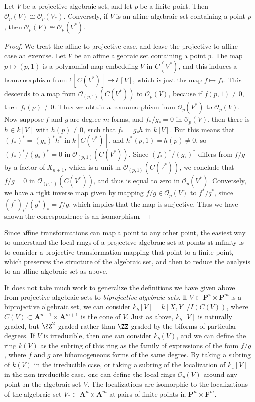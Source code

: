 \begin{theorem}
    Let $V$ be a projective algebraic set, and let $p$ be a finite point. Then $\mathcal{O}_p(V) \cong \mathcal{O}_p(V_*)$. Conversely, if $V$ is an affine algebraic set containing a point $p$, then $\mathcal{O}_p(V) \cong \mathcal{O}_p(V^*)$.
\end{theorem}
\begin{proof}
    We treat the affine to projective case, and leave the projective to affine case an exercise. Let $V$ be an affine algebraic set containing a point $p$. The map $p \mapsto (p,1)$ is a polynomial map embedding $V$ in $C(V^*)$, and this induces a homomorphism from $k[C(V^*)] \to k[V]$, which is just the map $f \mapsto f_*$. This descends to a map from $\mathcal{O}_{(p,1)}(C(V^*))$ to $\mathcal{O}_p(V)$, because if $f(p,1) \neq 0$, then $f_*(p) \neq 0$. Thus we obtain a homomorphism from $\mathcal{O}_p(V^*)$ to $\mathcal{O}_p(V)$. Now suppose $f$ and $g$ are degree $m$ forms, and $f_*/g_* = 0$ in $\mathcal{O}_p(V)$, then there is $h \in k[V]$ with $h(p) \neq 0$, such that $f_* = g_* h$ in $k[V]$. But this means that $(f_*)^* = (g_*)^* h^*$ in $k[C(V^*)]$, and $h^*(p,1) = h(p) \neq 0$, so $(f_*)^*/(g_*)^* = 0$ in $\mathcal{O}_{(p,1)}(C(V^*))$. Since $(f_*)^*/(g_*)^*$ differs from $f/g$ by a factor of $X_{n+1}$, which is a unit in $\mathcal{O}_{(p,1)}(C(V^*))$, we conclude that $f/g = 0$ in $\mathcal{O}_{(p,1)}(C(V^*))$, and thus is equal to zero in $\mathcal{O}_p(V^*)$. Conversely, we have a right inverse map given by mapping $f/g \in \mathcal{O}_p(V)$ to $f^*/g^*$, since $(f^*)_*/(g^*)_* = f/g$, which implies that the map is surjective. Thus we have shown the correspondence is an isomorphism.
\end{proof}

Since affine transformations can map a point to any other point, the easiest way to understand the local rings of a projective algebraic set at points at infinity is to consider a projective transformation mapping that point to a finite point, which preserves the structure of the algebraic set, and then to reduce the analysis to an affine algebraic set as above.

It does not take much work to generalize the definitions we have given above from projective algebraic sets to \emph{biprojective algebraic sets}. If $V \subset \mathbf{P}^n \times \mathbf{P}^m$ is a biprojective algebraic set, we can consider $k_h[V] = k[X,Y]/I(C(V))$, where $C(V) \subset \mathbf{A}^{n+1} \times \mathbf{A}^{m+1}$ is the cone of $V$. Just as above, $k_h[V]$ is naturally graded, but $\ZZ^2$ graded rather than $\ZZ$ graded by the biforms of particular degrees. If $V$ is irreducible, then one can consider $k_h(V)$, and we can define the ring $k(V)$ as the subring of this ring as the family of expressions of the form $f/g$, where $f$ and $g$ are bihomogeneous forms of the same degree. By taking a subring of $k(V)$ in the irreducible case, or taking a subring of the localization of $k_h[V]$ in the non-irreducible case, one can define the local rings $\mathcal{O}_p(V)$ around any point on the algebraic set $V$. The localizations are isomorphic to the localizations of the algebraic set $V_* \subset \mathbf{A}^n \times \mathbf{A}^m$ at pairs of finite points in $\mathbf{P}^n \times \mathbf{P}^m$.

